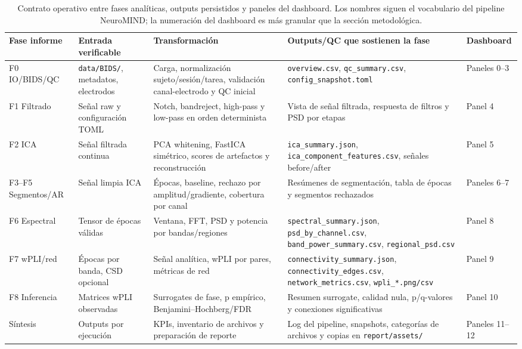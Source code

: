 \begin{fullwidth}
\begin{table}[H]
\centering
\scriptsize
\caption{Contrato operativo entre fases analíticas, outputs persistidos y paneles del dashboard. Los nombres siguen el vocabulario del pipeline NeuroMIND; la numeración del dashboard es más granular que la sección metodológica.}
\label{tab:pipeline-operational-contracts}
\begin{adjustbox}{max width=0.99\fulltextwidth}
\begin{tabular}{@{}p{0.10\fulltextwidth}p{0.20\fulltextwidth}p{0.23\fulltextwidth}p{0.24\fulltextwidth}p{0.15\fulltextwidth}@{}}
\toprule
\textbf{Fase informe} & \textbf{Entrada verificable} & \textbf{Transformación} & \textbf{Outputs/QC que sostienen la fase} & \textbf{Dashboard} \\
\midrule
F0 IO/BIDS/QC & \texttt{data/BIDS/}, metadatos, electrodos & Carga, normalización sujeto/sesión/tarea, validación canal-electrodo y QC inicial & \texttt{overview.csv}, \texttt{qc\_summary.csv}, \texttt{config\_snapshot.toml} & Paneles 0--3 \\
\addlinespace
F1 Filtrado & Señal raw y configuración TOML & Notch, bandreject, high-pass y low-pass en orden determinista & Vista de señal filtrada, respuesta de filtros y PSD por etapas & Panel 4 \\
\addlinespace
F2 ICA & Señal filtrada continua & PCA whitening, FastICA simétrico, scores de artefactos y reconstrucción & \texttt{ica\_summary.json}, \texttt{ica\_component\_features.csv}, señales before/after & Panel 5 \\
\addlinespace
F3--F5 Segmentos/AR & Señal limpia ICA & Épocas, baseline, rechazo por amplitud/gradiente, cobertura por canal & Resúmenes de segmentación, tabla de épocas y segmentos rechazados & Paneles 6--7 \\
\addlinespace
F6 Espectral & Tensor de épocas válidas & Ventana, FFT, PSD y potencia por bandas/regiones & \texttt{spectral\_summary.json}, \texttt{psd\_by\_channel.csv}, \texttt{band\_power\_summary.csv}, \texttt{regional\_psd.csv} & Panel 8 \\
\addlinespace
F7 wPLI/red & Épocas por banda, CSD opcional & Señal analítica, wPLI por pares, métricas de red & \texttt{connectivity\_summary.json}, \texttt{connectivity\_edges.csv}, \texttt{network\_metrics.csv}, \texttt{wpli\_*.png/csv} & Panel 9 \\
\addlinespace
F8 Inferencia & Matrices wPLI observadas & Surrogates de fase, p empírico, Benjamini--Hochberg/FDR & Resumen surrogate, calidad nula, p/q-valores y conexiones significativas & Panel 10 \\
\addlinespace
Síntesis & Outputs por ejecución & KPIs, inventario de archivos y preparación de reporte & Log del pipeline, snapshots, categorías de archivos y copias en \texttt{report/assets/} & Paneles 11--12 \\
\bottomrule
\end{tabular}
\end{adjustbox}
\end{table}
\end{fullwidth}

